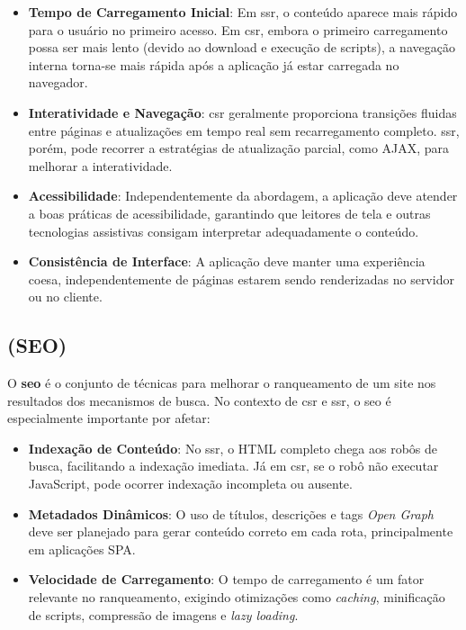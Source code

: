 \begin{itemize}
    \item \textbf{Tempo de Carregamento Inicial}: Em \acrshort{ssr}, o conteúdo aparece mais rápido para o usuário no primeiro acesso. Em \acrshort{csr}, embora o primeiro carregamento possa ser mais lento (devido ao download e execução de scripts), a navegação interna torna-se mais rápida após a aplicação já estar carregada no navegador.
    \item \textbf{Interatividade e Navegação}: \acrshort{csr} geralmente proporciona transições fluidas entre páginas e atualizações em tempo real sem recarregamento completo. \acrshort{ssr}, porém, pode recorrer a estratégias de atualização parcial, como AJAX, para melhorar a interatividade.
    \item \textbf{Acessibilidade}: Independentemente da abordagem, a aplicação deve atender a boas práticas de acessibilidade, garantindo que leitores de tela e outras tecnologias assistivas consigam interpretar adequadamente o conteúdo.
    \item \textbf{Consistência de Interface}: A aplicação deve manter uma experiência coesa, independentemente de páginas estarem sendo renderizadas no servidor ou no cliente.
\end{itemize}

\subsection{ (SEO)}
\label{sec:seo}
O \textbf{\acrshort{seo}} é o conjunto de técnicas para melhorar o ranqueamento de um site nos resultados dos mecanismos de busca. No contexto de \acrshort{csr} e \acrshort{ssr}, o \acrshort{seo} é especialmente importante por afetar:

\begin{itemize}
    \item \textbf{Indexação de Conteúdo}: No \acrshort{ssr}, o HTML completo chega aos robôs de busca, facilitando a indexação imediata. Já em \acrshort{csr}, se o robô não executar JavaScript, pode ocorrer indexação incompleta ou ausente.
    \item \textbf{Metadados Dinâmicos}: O uso de títulos, descrições e tags \textit{Open Graph} deve ser planejado para gerar conteúdo correto em cada rota, principalmente em aplicações SPA.
    \item \textbf{Velocidade de Carregamento}: O tempo de carregamento é um fator relevante no ranqueamento, exigindo otimizações como \textit{caching}, minificação de scripts, compressão de imagens e \textit{lazy loading}.
\end{itemize}

